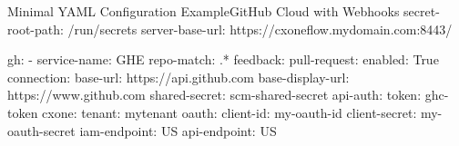 \begin{code}{Minimal YAML Configuration Example}{GitHub Cloud with Webhooks}{}
secret-root-path: /run/secrets
server-base-url: https://cxoneflow.mydomain.com:8443/

gh:
    - service-name: GHE
        repo-match: .*
        feedback:
        pull-request:
            enabled: True
        connection:
        base-url: https://api.github.com
        base-display-url: https://www.github.com
        shared-secret: scm-shared-secret
        api-auth:
            token: ghc-token
        cxone:
        tenant: mytenant
        oauth:
            client-id: my-oauth-id
            client-secret: my-oauth-secret
        iam-endpoint: US
        api-endpoint: US
\end{code}
  